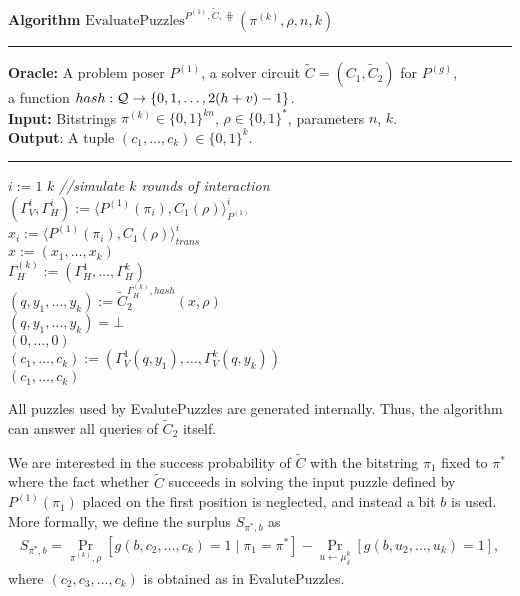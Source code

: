 \begin{codeblock}
  \textbf{Algorithm} $\text{EvaluatePuzzles}^{P^{(1)}, \widetilde{C}, \hash}(\pi^{(k)}, \rho, n, k)$
  \medskip \hrule
  \textbf{Oracle:}  A problem poser $P^{(1)}$, a solver circuit $\widetilde{C} = (C_1, \widetilde{C}_2)$ for $P^{(g)}$,\\
  \IndII a function $hash : \mathcal{Q} \rightarrow \{0,1,\dots, 2(h+v)-1\}$.\\
  \textbf{Input:} Bitstrings $\pi^{(k)} \in \{0,1\}^{kn}$, $\rho \in \{0,1\}^{*}$, parameters $n$, $k$.\\
  \textbf{Output}: A tuple $(c_1, \dots, c_k) \in \{0,1\}^{k}$.
  \medskip\hrule
  \For $i:=1$ \To $k$ \Do \IndII \textit{//simulate $k$ rounds of interaction} \\
  \IndI $(\Gamma_V^{i}, \Gamma_H^{i}) := \langle P^{(1)}(\pi_i), C_1(\rho) \rangle_{P^{(1)}}^i$\\
  \IndI $x_i := \langle P^{(1)}(\pi_i), C_1(\rho) \rangle^i_{\mathit{trans}}$ \\
  $x := (x_1, \dots, x_k)$ \\
  $\Gamma_H^{(k)} := (\Gamma_H^1, \dotsc, \Gamma_H^k)$ \\
  $(q, y_1, \dots, y_k) := \widetilde{C}_2^{\Gamma_H^{(k)}, hash} (x, \rho)$ \\
  \If $(q, y_1, \dots, y_k) = \bot$ \Then \\
  \IndI \Return $(0, \dotsc, 0)$ \\
  $(c_1, \dotsc, c_k) := (\Gamma_V^{1}(q, y_1), \dotsc, \Gamma_V^{k}(q, y_k))$\\
  \Return $(c_1, \dotsc, c_k)$
\end{codeblock}
%
All puzzles used by EvalutePuzzles are generated internally. Thus, the algorithm can answer all queries of $\widetilde{C}_2$ itself.

We are interested in the success probability of $\widetilde{C}$ with the bitstring $\pi_1$ fixed to $\pi^*$ where
the fact whether $\widetilde{C}$ succeeds in solving the input puzzle defined by $P^{(1)}(\pi_1)$ placed on the first position is neglected,
and instead a bit $b$ is used. More formally, we define the surplus $S_{\pi^*, b}$ as
\begin{align}
  \label{eq:s_pi_b}
S_{\pi^*, b} = \underset{\pi^{(k)}, \rho}{\Pr}\left[g(b, c_2, \dots, c_k) = 1 \mid \pi_1 = \pi^*\right] - \underset{u \leftarrow \mu^{k}_{\delta}}{\Pr}\left[g(b, u_2, \dots, u_k) = 1\right],
\end{align}
where $(c_2, c_3, \dotsc, c_k)$ is obtained as in EvalutePuzzles.

